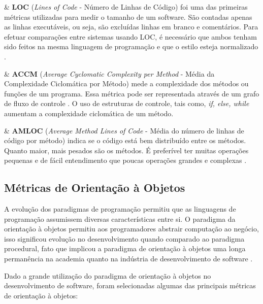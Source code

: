 \begin{easylist}[itemize]


	& \textbf{LOC} (\textit{Lines of Code} - Número de Linhas de Código)
	foi uma das primeiras métricas utilizadas para medir o tamanho de um 
	software. São contadas apenas as linhas executáveis, ou seja, são excluídas linhas em branco e comentários. Para efetuar comparações entre sistemas usando LOC, é necessário que ambos tenham sido feitos na mesma linguagem de programação e que o estilo esteja normalizado \cite{Jones91}.
	
	& \textbf{ACCM} (\textit{Average Cyclomatic Complexity per Method} - 
	Média da Complexidade Ciclomática por Método) mede a complexidade dos 
	métodos ou funções de um programa. Essa métrica pode ser representada 
	através de um grafo de fluxo de controle \cite{McCabe76}. O uso de 
	estruturas de controle, tais como, \textit{if, else, while} aumentam a 
	complexidade ciclomática de um método.

	& \textbf{AMLOC} (\textit{Average Method Lines of Code} - Média do número de linhas de código por método)  indica se o código está bem distribuído entre os métodos. Quanto maior, mais pesados são os métodos. É preferível ter muitas operações pequenas e de fácil entendimento que poucas operações grandes e complexas \cite{Meirelles2013}.

\end{easylist}


\subsection{Métricas de Orientação à Objetos}
\label{métrica objetos}

A evolução dos paradigmas de programação permitiu que as linguagens de 
programação assumissem diversas características entre si. O
paradigma da orientação à objetos permitiu aos programadores abstrair computação ao negócio, isso significou evolução no desenvolvimento quando comparado ao paradigma procedural, fato que implicou a paradigma de orientação à objetos uma longa permanência na academia quanto na indústria de desenvolvimento de software \cite{Li1993}.

Dado a grande utilização do paradigma de orientação à objetos no desenvolvimento de software, foram selecionadas algumas das principais métricas de orientação à objetos:


